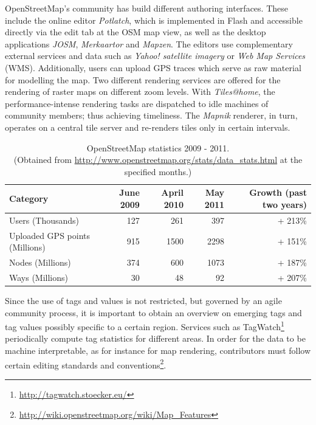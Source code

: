 OpenStreetMap's community has build different authoring interfaces. These include the online editor \textit{Potlatch}, which is
implemented in Flash and accessible directly via the edit tab at the OSM map view, as well as the desktop applications \textit{JOSM}, \textit{Merkaartor} and \textit{Mapzen}. The editors use complementary external services and data such as \textit{Yahoo! satellite imagery} or \textit{Web Map Services} (WMS).
Additionally, users can upload GPS traces which serve as raw material for modelling the map.
Two different rendering services are offered for the rendering of raster maps on different zoom levels.
With \textit{Tiles@home}, the performance-intense rendering tasks are dispatched to idle machines of community members; thus achieving timeliness.
The \textit{Mapnik} renderer, in turn, operates on a central tile server and re-renders tiles only in certain intervals.

\begin{table}[thb]
	\centering
		\begin{tabular}{lrrrr}
\textbf{Category} & \textbf{June 2009} & \textbf{April 2010} & \textbf{May 2011} & \textbf{Growth (past two years)} \\
\hline
Users (Thousands)	& 127 & 261 & 397 & + 213\% \\
Uploaded GPS points	(Millions) & 915 & 1500 & 2298 & + 151\% \\
Nodes (Millions)	& 374 & 600 & 1073 & + 187\% \\
Ways (Millions)	& 30 & 48 & 92 & + 207\% \\
		\end{tabular}
	\caption{OpenStreetMap statistics 2009 - 2011.\\(Obtained from \url{http://www.openstreetmap.org/stats/data_stats.html} at the specified months.)}
	\label{tab:OSMStatistics}
\end{table}

Since the use of tags and values is not restricted, but governed by an agile community process, it is important to obtain an overview on emerging tags and tag values possibly specific to a certain region.
Services such as TagWatch\footnote{\url{http://tagwatch.stoecker.eu/}} periodically compute tag statistics for different areas.
In order for the data to be machine interpretable, as for instance for map rendering, contributors must follow certain editing standards and conventions\footnote{\url{http://wiki.openstreetmap.org/wiki/Map_Features}}.

